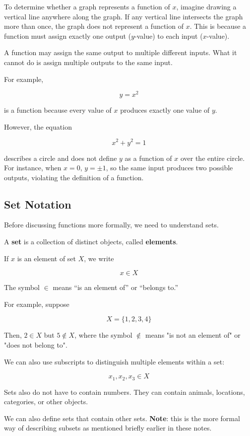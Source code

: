 \documentclass[12pt]{article}
\begin{document}
To determine whether a graph represents a function of $x$, imagine drawing a vertical line anywhere along the graph. If any vertical line intersects the graph more than once, the graph does not represent a function of $x$. This is because a function must assign exactly one output ($y$-value) to each input ($x$-value).

A function may assign the same output to multiple different inputs. What it cannot do is assign multiple outputs to the same input.

For example,

\[
y=x^2
\]

is a function because every value of $x$ produces exactly one value of $y$.

However, the equation

\[
x^2+y^2=1
\]

describes a circle and does not define $y$ as a function of $x$ over the entire circle.
For instance, when $x=0$, \(y=\pm 1\), so 
the same input produces two possible outputs, violating the definition of a function.

\subsection{Set Notation}

Before discussing functions more formally, we need to understand sets.

A \textbf{set} is a collection of distinct objects, called \textbf{elements}.

If $x$ is an element of set $X$, we write

\[
x\in X
\]

The symbol $\in$ means ``is an element of'' or ``belongs to.''

For example, suppose

\[
X=\{1,2,3,4\}
\]

Then, \(
2\in X
\)
but \(
5\notin X
\), where the symbol $\notin$ means "is not an element of" or "does not belong to".

We can also use subscripts to distinguish multiple elements within a set:

\[
x_1,x_2,x_3\in X
\]

Sets also do not have to contain numbers. They can contain animals, locations, categories, or other objects.


We can also define sets that contain other sets. \textbf{Note}: this is the more formal way of describing subsets as mentioned briefly earlier in these notes.
\end{document}
